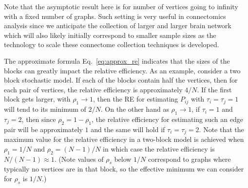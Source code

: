 \documentclass[10pt,letterpaper]{article}
\begin{document}
Note that the asymptotic result here is for number of vertices going to infinity with a fixed number of graphs. Such setting is very useful in connectomics analysis since we anticipate the collection of larger and larger brain network which will also likely initially correspond to smaller sample sizes as the technology to scale these connectome collection techniques is developed.

The approximate formula Eq.~\ref{eq:approx_re} indicates that the sizes of the blocks can greatly impact the relative efficiency.
As an example, consider a two block stochastic model. 
If each of the blocks contain half the vertices, then for each pair of vertices, the relative efficiency is approximately $4/N$. 
If the first block gets larger, with $\rho_1\to 1$, then the RE for estimating $P_{ij}$ with $\tau_i=\tau_j=1$ will tend to its minimum of $2/N$. 
On the other hand as $\rho_1\to 1$, if $\tau_i=1$ and $\tau_j=2$, then since $\rho_2=1-\rho_1$, the relative efficiency for estimating such an edge pair will be approximately $1$ and the same will hold if $\tau_i=\tau_j=2$.
Note that the maximum value for the relative efficiency in a two-block model is achieved when $\rho_1=1/N$ and $\rho_2=(N-1)/N$ in which case the relative efficiency is $N/(N-1) \approx 1$.
(Note values of $\rho_s$ below $1/N$ correspond to graphs where typically no vertices are in that block, so the effective minimum we can consider for $\rho_s$ is $1/N$.)

\end{document}
